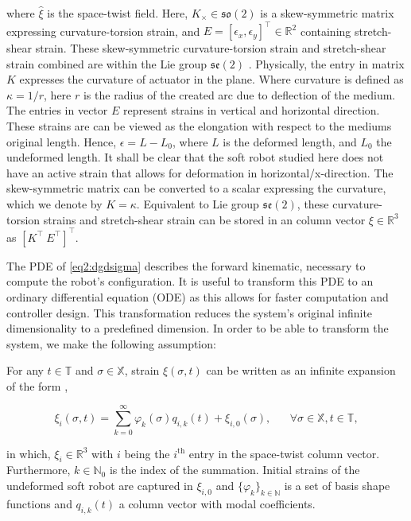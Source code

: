 where $\hat{\xi}$ is the space-twist field. Here, $K_\times \in \mathfrak{so}(2)$ is a skew-symmetric matrix expressing curvature-torsion strain, and $E = [\epsilon_x,\epsilon_y]^\top \in \mathbb{R}^2$ containing stretch-shear strain. These skew-symmetric curvature-torsion strain and stretch-shear strain combined are within the Lie group $\mathfrak{se}(2)$ \cite{Sola2018}. Physically, the entry in matrix $K$ expresses the curvature of actuator in the plane. Where curvature is defined as $\kappa = 1/r$, here $r$ is the radius of the created arc due to deflection of the medium. The entries in vector $E$ represent strains in vertical and horizontal direction. These strains are can be viewed as the elongation with respect to the mediums original length. Hence, $\epsilon = L-L_0$, where $L$ is the deformed length, and $L_0$ the undeformed length. It shall be clear that the soft robot studied here does not have an active strain that allows for deformation in horizontal/x-direction. The skew-symmetric matrix can be converted to a scalar expressing the curvature, which we denote by $K = \kappa$. Equivalent to Lie group $\mathfrak{se}(2)$, these curvature-torsion strains and stretch-shear strain can be stored in an column vector $\xi \in \mathbb{R}^3$ as $[K^\top \hspace{3pt} E^\top ]^\top$.

The PDE of \ref{eq2:dgdsigma} describes the forward kinematic, necessary to compute the robot's configuration. It is useful to transform this PDE to an ordinary differential equation (ODE) as this allows for faster computation and controller design. This transformation reduces the system's original infinite dimensionality to a predefined dimension. In order to be able to transform the system, we make the following assumption: 

\begin{theorem}

For any $t \in \mathbb{T}$ and $\sigma \in \mathbb{X}$, strain $\xi(\sigma,t)$ can be written as an infinite expansion of the form \cite{Caasenbrood2021},

\begin{equation}
\xi_i(\sigma,t) = \sum_{k=0}^\infty \varphi_k(\sigma)q_{i,k}(t) + \xi_{i,0}(\sigma), \hspace{20pt} \forall \sigma \in \mathbb{X}, t \in \mathbb{T},
\label{eq2:strainexact}
\end{equation}

in which, $\xi_{i} \in \mathbb{R}^3 $ with $i$ being the $i^{\text{th}}$ entry in the space-twist column vector. Furthermore, $k \in \mathbb{N}_0$ is the index of the summation. Initial strains of the undeformed soft robot are captured in $\xi_{i,0}$ and $\{\varphi_k\}_{k \in \mathbb{N}}$ is a set of basis shape functions and $q_{i,k}(t)$ a column vector with modal coefficients. 
\end{theorem}

